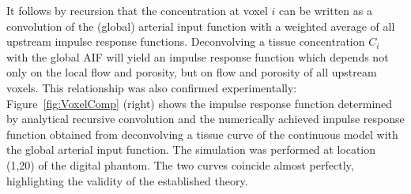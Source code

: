 \documentclass[final,5p,times,twocolumn]{elsarticle}
\begin{document}
	It follows by recursion that the concentration at voxel $i$ can be written as a convolution of the (global) arterial input function with a weighted average of all upstream impulse response functions.
	Deconvolving a tissue concentration $C_i$ with the global AIF will yield an impulse response function which depends not only on the local flow and porosity, but on flow and porosity of all upstream voxels.
	This relationship was also confirmed experimentally: Figure~\ref{fig:VoxelComp} (right) shows the impulse response function determined by analytical recursive convolution and the numerically achieved impulse response function obtained from deconvolving a tissue curve of the continuous model with the global arterial input function. 
	The simulation was performed at location (1,20) of the digital phantom.
	The two curves coincide almost perfectly, highlighting the validity of the established theory.
\end{document}
